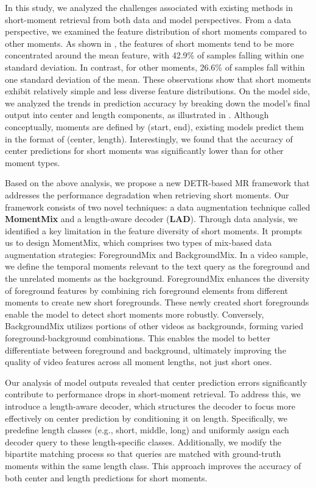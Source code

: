 In this study, we analyzed the challenges associated with existing methods in short-moment retrieval from both data and model perspectives. From a data perspective, we examined the feature distribution of short moments compared to other moments.  As shown in , the features of short moments tend to be more concentrated around the mean feature, with 42.9\% of samples falling within one standard deviation. In contrast, for other moments, 26.6\% of samples fall within one standard deviation of the mean. These observations show that short moments exhibit relatively simple and less diverse feature distributions. On the model side, we analyzed the trends in prediction accuracy by breaking down the model’s final output into center and length components, as illustrated in . Although conceptually, moments are defined by (start, end), existing models predict them in the format of (center, length). Interestingly, we found that the accuracy of center predictions for short moments was significantly lower than for other moment types.

Based on the above analysis, we propose a new DETR-based MR framework that addresses the performance degradation when retrieving short moments. Our framework consists of two novel techniques: a data augmentation technique called \textbf{MomentMix} and a length-aware decoder (\textbf{LAD}). Through data analysis, we identified a key limitation in the feature diversity of short moments. It prompts us to design MomentMix, which comprises two types of mix-based data augmentation strategies: ForegroundMix and BackgroundMix. In a video sample, we define the temporal moments relevant to the text query as the foreground and the unrelated moments as the background. ForegroundMix enhances the diversity of foreground features by combining rich foreground elements from different moments to create new short foregrounds. These newly created short foregrounds enable the model to detect short moments more robustly. Conversely, BackgroundMix utilizes portions of other videos as backgrounds, forming varied foreground-background combinations. This enables the model to better differentiate between foreground and background, ultimately improving the quality of video features across all moment lengths, not just short ones. 

Our analysis of model outputs revealed that center prediction errors significantly contribute to performance drops in short-moment retrieval. To address this, we introduce a length-aware decoder, which structures the decoder to focus more effectively on center prediction by conditioning it on length. Specifically, we predefine length classes (e.g., short, middle, long) and uniformly assign each decoder query to these length-specific classes. Additionally, we modify the bipartite matching process so that queries are matched with ground-truth moments within the same length class. This approach improves the accuracy of both center and length predictions for short moments.

